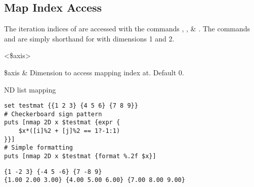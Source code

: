 \documentclass{article}
\begin{document}
\subsection{Map Index Access}
The iteration indices of  are accessed with the commands , , \& . 
The commands  and  are simply shorthand for  with dimensions 1 and 2.
\begin{syntax}
 <\$axis>
\end{syntax}
\begin{syntax}
\end{syntax}
\begin{syntax}
\end{syntax}
\begin{args}	
\$axis & Dimension to access mapping index at. Default 0.
\end{args}
\begin{example}{ND list mapping}
\begin{lstlisting}
set testmat {{1 2 3} {4 5 6} {7 8 9}}
# Checkerboard sign pattern
puts [nmap 2D x $testmat {expr {
    $x*([i]%2 + [j]%2 == 1?-1:1)
}}]
# Simple formatting
puts [nmap 2D x $testmat {format %.2f $x}]
\end{lstlisting}
\tcblower
\begin{lstlisting}
{1 -2 3} {-4 5 -6} {7 -8 9}
{1.00 2.00 3.00} {4.00 5.00 6.00} {7.00 8.00 9.00}
\end{lstlisting}
\end{example}


\clearpage
\end{document}
